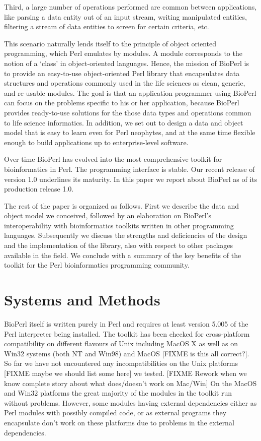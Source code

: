 \documentclass{article}
\begin{document}
\begin{twocolumn}
Third, a large number of operations performed are common between
applications, like parsing a data entity out of an input stream,
writing manipulated entities, filtering a stream of data entities to
screen for certain criteria, etc. 

This scenario naturally lends itself to the principle of object
oriented programming, which Perl emulates by modules.  A module
corresponds to the notion of a `class' in object-oriented languages.
Hence, the mission of BioPerl is to provide an easy-to-use
object-oriented Perl library that encapsulates data structures and
operations commonly used in the life sciences as clean, generic, and
re-usable modules.  The goal is that an application programmer using
BioPerl can focus on the problems specific to his or her application,
because BioPerl provides ready-to-use solutions for the those data
types and operations common to life science informatics.  In addition,
we set out to design a data and object model that is easy to learn
even for Perl neophytes, and at the same time flexible enough to build
applications up to enterprise-level software.

Over time BioPerl has evolved into the most comprehensive toolkit for
bioinformatics in Perl.  The programming interface is stable.  Our
recent release of version 1.0 underlines its maturity.  In this paper
we report about BioPerl as of its production release 1.0.

The rest of the paper is organized as follows.  First we describe the
data and object model we conceived, followed by an elaboration on
BioPerl's interoperability with bioinformatics toolkits written in
other programming languages.  Subsequently we discuss the strengths and
deficiencies of the design and the implementation of the library, also
with respect to other packages available in the field.  We conclude
with a summary of the key benefits of the toolkit for the Perl
bioinformatics programming community.

\section{Systems and Methods}

BioPerl itself is written purely in Perl and requires at least version
5.005 of the Perl interpreter being installed.  The toolkit has been
checked for cross-platform compatibility on different flavours of Unix
including MacOS X as well as on Win32 systems (both NT and Win98) and
MacOS [FIXME is this all correct?].  So far we have not encountered any
incompatibilities on the Unix platforms [FIXME maybe we should list
some here] we tested.  [FIXME Rework when we know complete story about
what does/doesn't work on Mac/Win] On the MacOS and Win32 platforms
the great majority of the modules in the toolkit run without
problems.  However, some modules having external dependencies either as
Perl modules with possibly compiled code, or as external programs they
encapsulate don't work on these platforms due to problems in the
external dependencies.


\end{twocolumn}
\end{document}
